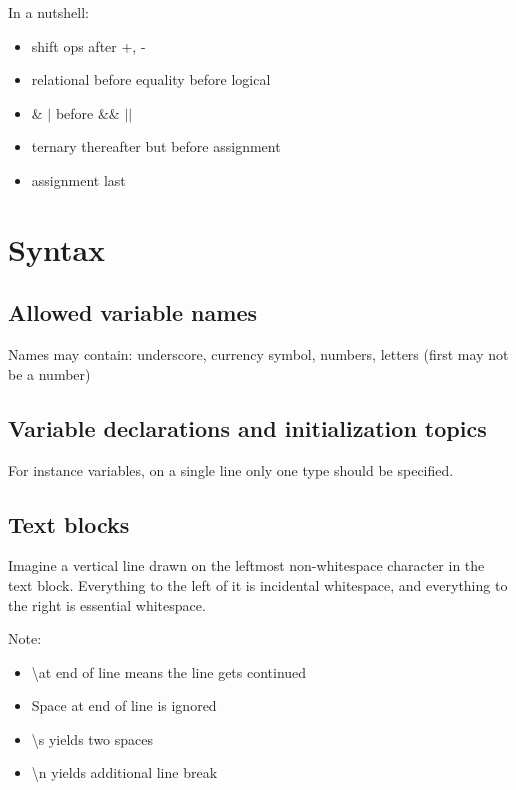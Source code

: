 \documentclass{scrartcl}
\begin{document}
    In a nutshell:

    \begin{itemize}
        \item shift ops after +, -
        \item relational before equality before logical
        \item \& $|$ before \&\& $||$
        \item ternary thereafter but before assignment
        \item assignment last
    \end{itemize}

\section{Syntax}
\subsection{Allowed variable names}

    Names may contain: underscore, currency symbol, numbers, letters (first may not be a number)

\subsection{Variable declarations and initialization topics}

    For instance variables, on a single line only one type should be specified.



\subsection{Text blocks}

    Imagine a vertical line drawn on the leftmost non-­whitespace character in the text block. Everything to the left of it is incidental whitespace, and everything to the right is essential whitespace.

    Note:
    \begin{itemize}
        \item  \textbackslash at end of line means the line gets continued
        \item Space at end of line is ignored
        \item \textbackslash s yields two spaces
        \item  \textbackslash n yields additional line break
    \end{itemize}
\end{document}
